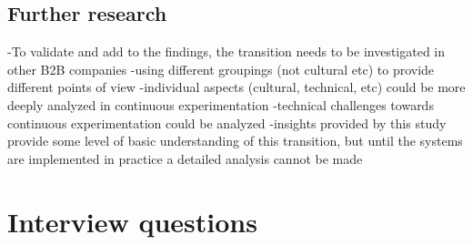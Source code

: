 \documentclass[english]{tktltiki2}
\theoremstyle{definition}
\theoremstyle{remark}
\begin{document}
%
%











\subsection{Further research}
-To validate and add to the findings, the transition needs to be investigated in other B2B companies 
-using different groupings (not cultural etc) to provide different points of view
-individual aspects (cultural, technical, etc) could be more deeply analyzed in continuous experimentation 
-technical challenges towards continuous experimentation could be analyzed
-insights provided by this study provide some level of basic understanding of this transition, but until the systems are implemented in practice a detailed analysis cannot be made







\newpage

%
%
% 
%






\newpage

\appendix
 
\section{Interview questions}
\end{document}
